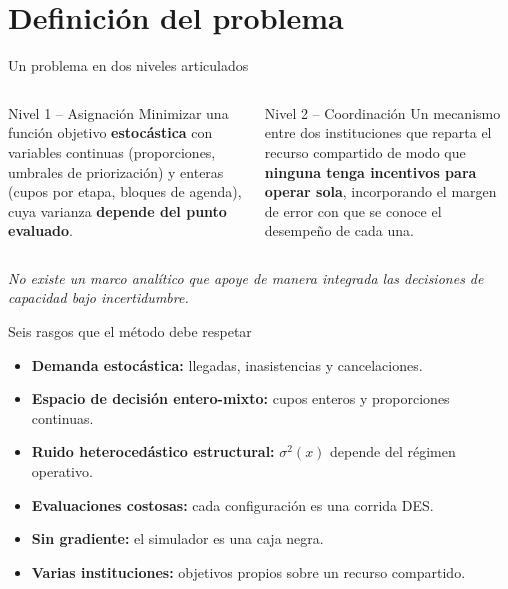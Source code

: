 \documentclass[aspectratio=169,11pt,xcolor=table]{beamer}
\begin{document}
\section{Definición del problema}

\begin{frame}{Un problema en dos niveles articulados}
  \begin{columns}[T]
      \begin{block}{Nivel 1 -- Asignación}
        Minimizar una función objetivo \textbf{estocástica} con variables continuas
        (proporciones, umbrales de priorización) y enteras (cupos por etapa,
        bloques de agenda), cuya varianza \textbf{depende del punto evaluado}.
      \end{block}
      \begin{block}{Nivel 2 -- Coordinación}
        Un mecanismo entre dos instituciones que reparta el recurso compartido de
        modo que \textbf{ninguna tenga incentivos para operar sola}, incorporando el
        margen de error con que se conoce el desempeño de cada una.
      \end{block}
  \end{columns}
  \vspace{1.5em}
  \begin{center}
    \textit{No existe un marco analítico que apoye de manera integrada las decisiones
    de capacidad bajo incertidumbre.}
  \end{center}
\end{frame}

\begin{frame}{Seis rasgos que el método debe respetar}
  \begin{itemize}
    \item<1-> \textbf{Demanda estocástica:} llegadas, inasistencias y cancelaciones.
    \item<2-> \textbf{Espacio de decisión entero-mixto:} cupos enteros y proporciones continuas.
    \item<3-> \textbf{Ruido heterocedástico estructural:} $\sigma^2(x)$ depende del régimen operativo.
    \item<4-> \textbf{Evaluaciones costosas:} cada configuración es una corrida DES.
    \item<5-> \textbf{Sin gradiente:} el simulador es una caja negra.
    \item<6-> \textcolor{ucorange}{\textbf{Varias instituciones:}} objetivos propios sobre un recurso compartido.
  \end{itemize}
\end{frame}
\end{document}
